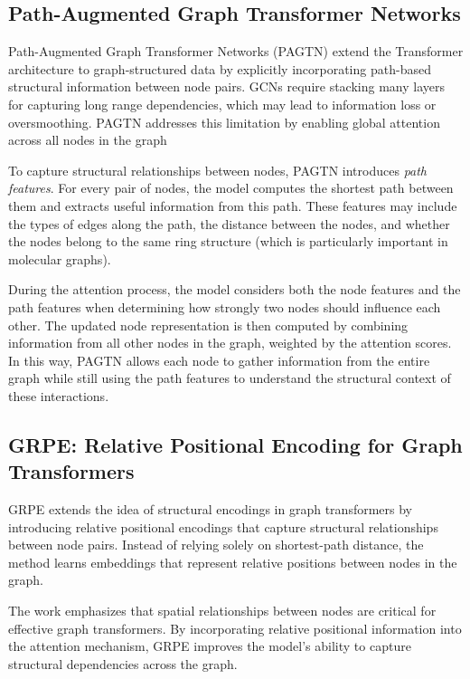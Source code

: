 \documentclass[11pt]{article}
\begin{document}
\subsection{Path-Augmented Graph Transformer Networks \cite{pagtn}}

Path-Augmented Graph Transformer Networks (PAGTN) extend the Transformer architecture to graph-structured data by explicitly incorporating path-based structural information between node pairs. GCNs require stacking many layers for capturing long range dependencies, which may lead to information loss or oversmoothing. PAGTN addresses this limitation by enabling global attention across all nodes in the graph

To capture structural relationships between nodes, PAGTN introduces \emph{path features}. For every pair of nodes, the model computes the shortest path between them and extracts useful information from this path. These features may include the types of edges along the path, the distance between the nodes, and whether the nodes belong to the same ring structure (which is particularly important in molecular graphs).

During the attention process, the model considers both the node features and the path features when determining how strongly two nodes should influence each other. The updated node representation is then computed by combining information from all other nodes in the graph, weighted by the attention scores. In this way, PAGTN allows each node to gather information from the entire graph while still using the path features to understand the structural context of these interactions.

\subsection{GRPE: Relative Positional Encoding for Graph Transformers \cite{grpe}}

GRPE extends the idea of structural encodings in graph transformers by introducing relative positional encodings that capture structural relationships between node pairs. Instead of relying solely on shortest-path distance, the method learns embeddings that represent relative positions between nodes in the graph.

The work emphasizes that spatial relationships between nodes are critical for effective graph transformers. By incorporating relative positional information into the attention mechanism, GRPE improves the model's ability to capture structural dependencies across the graph.
\end{document}
